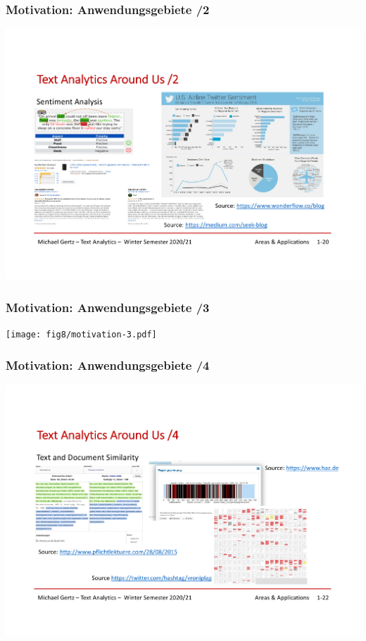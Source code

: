 
\begin{frame}[c]
    \frametitle{Motivation: Anwendungsgebiete /2}

    \centering\includegraphics[width=\textwidth]{fig8/motivation-2.pdf}
\end{frame}


\begin{frame}[c]
    \frametitle{Motivation: Anwendungsgebiete /3}

    \centering\texttt{[image: fig8/motivation-3.pdf]}
\end{frame}


\begin{frame}[c]
    \frametitle{Motivation: Anwendungsgebiete /4}

    \centering\includegraphics[width=\textwidth]{fig8/motivation-4.pdf}
\end{frame}

